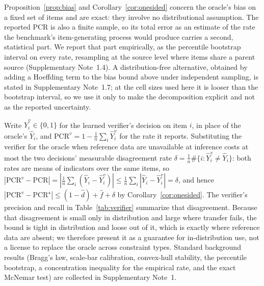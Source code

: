 \documentclass[pdflatex,sn-nature]{sn-jnl}
\begin{document}
Proposition~\ref{prop:bias} and Corollary~\ref{cor:onesided} concern the oracle's bias on
a fixed set of items and are exact: they involve no distributional assumption. The reported
PCR is also a finite sample, so its total error as an estimate of the rate the benchmark's
item-generating process would produce carries a second, statistical part. We report that part
empirically, as the percentile bootstrap interval on every rate, resampling at the source
level where items share a parent source (Supplementary Note~1.4). A distribution-free
alternative, obtained by adding a Hoeffding term to the bias bound above under independent
sampling, is stated in Supplementary Note~1.7; at the cell sizes used here it is looser than
the bootstrap interval, so we use it only to make the decomposition explicit and not as the
reported uncertainty.

\noindent Write $\hat Y^v_i\in\{0,1\}$ for the learned verifier's decision on item $i$, in
place of the oracle's $\hat Y_i$, and $\mathrm{PCR}^v=1-\frac1n\sum_i\hat Y^v_i$ for the rate
it reports. Substituting the verifier for the oracle when reference data are unavailable at
inference costs at most the two decisions' measurable disagreement rate
$\delta=\frac1n\#\{i:\hat Y^v_i\neq\hat Y_i\}$: both rates are means of indicators over the
same items, so $|\mathrm{PCR}^v-\mathrm{PCR}|=|\frac1n\sum_i(\hat Y_i-\hat Y^v_i)|
\le\frac1n\sum_i|\hat Y_i-\hat Y^v_i|=\delta$, and hence
$|\mathrm{PCR}^v-\mathrm{PCR}^\star|\le(1-\hat d)+\hat f+\delta$ by
Corollary~\ref{cor:onesided}. The verifier's precision and recall in
Table~\ref{tab:verifier} summarize that disagreement. Because that disagreement is
small only in distribution and large where transfer fails, the bound is tight in
distribution and loose out of it, which is exactly where reference data are absent; we
therefore present it as a guarantee for in-distribution use, not a license to replace the
oracle across constraint types. Standard background results
(Bragg's law, scale-bar calibration, convex-hull stability, the percentile bootstrap, a
concentration inequality for the empirical rate, and the exact McNemar test) are
collected in Supplementary Note~1.
\end{document}

